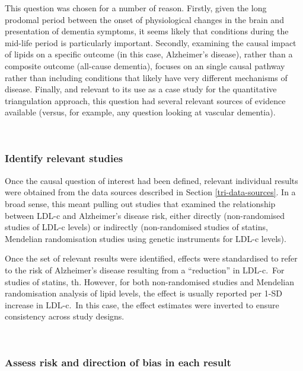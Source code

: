 \documentclass[a4paper, twoside]{templates/ociamthesis}
\begin{document}
This question was chosen for a number of reason. Firstly, given the long prodomal period between the onset of physiological changes in the brain and presentation of dementia symptoms, it seems likely that conditions during the mid-life period is particularly important. Secondly, examining the causal impact of lipids on a specific outcome (in this case, Alzheimer's disease), rather than a composite outcome (all-cause dementia), focuses on an single causal pathway rather than including conditions that likely have very different mechanisms of disease. Finally, and relevant to its use as a case study for the quantitative triangulation approach, this question had several relevant sources of evidence available (versus, for example, any question looking at vascular dementia).

~

\hypertarget{identify-relevant-studies}{%
\subsubsection{Identify relevant studies}\label{identify-relevant-studies}}

Once the causal question of interest had been defined, relevant individual results were obtained from the data sources described in Section \ref{tri-data-sources}. In a broad sense, this meant pulling out studies that examined the relationship between LDL-c and Alzheimer's disease risk, either directly (non-randomised studies of LDL-c levels) or indirectly (non-randomised studies of statins, Mendelian randomisation studies using genetic instruments for LDL-c levels).

Once the set of relevant results were identified, effects were standardised to refer to the risk of Alzheimer's disease resulting from a ``reduction'' in LDL-c.~For studies of statins, th. However, for both non-randomised studies and Mendelian randomisation analysis of lipid levels, the effect is usually reported per 1-SD increase in LDL-c.~In this case, the effect estimates were inverted to ensure consistency across study designs.

~

\hypertarget{assess-risk-and-direction-of-bias-in-each-result}{%
\subsubsection{Assess risk and direction of bias in each result}\label{assess-risk-and-direction-of-bias-in-each-result}}
\end{document}
